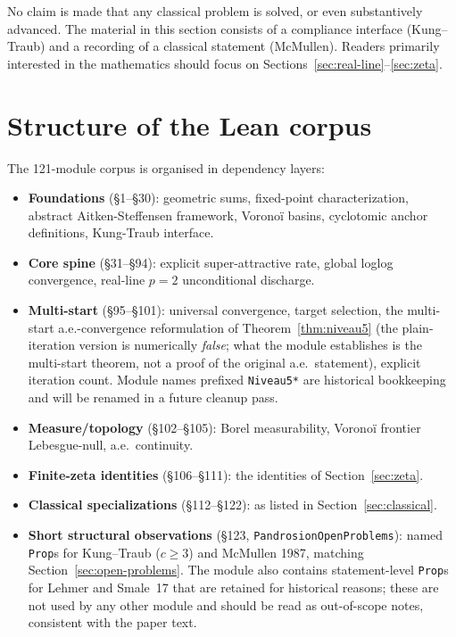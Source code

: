 \documentclass[11pt,a4paper]{article}
\theoremstyle{definition}
\theoremstyle{remark}
\begin{document}
No claim is made that any classical problem is solved, or even
substantively advanced. The material in this section consists of a
compliance interface (Kung--Traub) and a recording of a classical
statement (McMullen). Readers primarily interested in the mathematics
should focus on Sections~\ref{sec:real-line}--\ref{sec:zeta}.

\section{Structure of the Lean corpus}
\label{sec:modules}

The 121-module corpus is organised in dependency layers:

\begin{itemize}
  \item \textbf{Foundations} (\S1--\S30): geometric sums, fixed-point
        characterization, abstract Aitken-Steffensen framework,
        Voronoï basins, cyclotomic anchor definitions, Kung-Traub
        interface.
  \item \textbf{Core spine} (\S31--\S94): explicit super-attractive
        rate, global loglog convergence, real-line $p = 2$
        unconditional discharge.
  \item \textbf{Multi-start} (\S95--\S101): universal convergence,
        target selection, the multi-start a.e.-convergence
        reformulation of Theorem~\ref{thm:niveau5} (the
        plain-iteration version is numerically \emph{false}; what the
        module establishes is the multi-start theorem, not a proof of
        the original a.e.\ statement), explicit iteration count.
        Module names prefixed \texttt{Niveau5*} are historical
        bookkeeping and will be renamed in a future cleanup pass.
  \item \textbf{Measure/topology} (\S102--\S105): Borel measurability,
        Voronoï frontier Lebesgue-null, a.e.\ continuity.
  \item \textbf{Finite-zeta identities} (\S106--\S111): the identities
        of Section~\ref{sec:zeta}.
  \item \textbf{Classical specializations} (\S112--\S122): as listed
        in Section~\ref{sec:classical}.
  \item \textbf{Short structural observations} (\S123,
        \texttt{PandrosionOpenProblems}): named \texttt{Prop}s for
        Kung--Traub ($c\geq 3$) and McMullen 1987, matching
        Section~\ref{sec:open-problems}. The module also contains
        statement-level \texttt{Prop}s for Lehmer and Smale~17 that
        are retained for historical reasons; these are not used by
        any other module and should be read as out-of-scope notes,
        consistent with the paper text.
\end{itemize}
\end{document}
